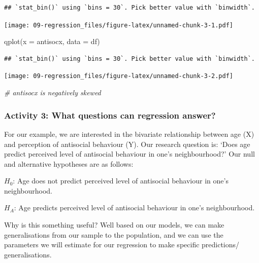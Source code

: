\documentclass[
]{book}
\newenvironment{Shaded}{\begin{snugshade}}{\end{snugshade}}
\newcommand{\AttributeTok}[1]{\textcolor[rgb]{0.77,0.63,0.00}{#1}}
\newcommand{\CommentTok}[1]{\textcolor[rgb]{0.56,0.35,0.01}{\textit{#1}}}
\newcommand{\FunctionTok}[1]{\textcolor[rgb]{0.00,0.00,0.00}{#1}}
\newcommand{\NormalTok}[1]{#1}
\begin{document}
\begin{verbatim}
## `stat_bin()` using `bins = 30`. Pick better value with `binwidth`.
\end{verbatim}

\texttt{[image: 09-regression\_files/figure-latex/unnamed-chunk-3-1.pdf]}

\begin{Shaded}
\begin{Highlighting}[]
\FunctionTok{qplot}\NormalTok{(}\AttributeTok{x =}\NormalTok{ antisocx, }\AttributeTok{data =}\NormalTok{ df)}
\end{Highlighting}
\end{Shaded}

\begin{verbatim}
## `stat_bin()` using `bins = 30`. Pick better value with `binwidth`.
\end{verbatim}

\texttt{[image: 09-regression\_files/figure-latex/unnamed-chunk-3-2.pdf]}

\begin{Shaded}
\begin{Highlighting}[]
\CommentTok{\# antisocx is negatively skewed}
\end{Highlighting}
\end{Shaded}

\hypertarget{activity-3-what-questions-can-regression-answer}{%
\subsubsection{Activity 3: What questions can regression answer?}\label{activity-3-what-questions-can-regression-answer}}

For our example, we are interested in the bivariate relationship between age (X) and perception of antisocial behaviour (Y). Our research question is: `Does age predict perceived level of antisocial behaviour in one's neighbourhood?' Our null and alternative hypotheses are as follows:

\(H_0\): Age does not predict perceived level of antisocial behaviour in one's neighbourhood.

\(H_A\): Age predicts perceived level of antisocial behaviour in one's neighbourhood.

Why is this something useful? Well based on our models, we can make generalisations from our sample to the population, and we can use the parameters we will estimate for our regression to make specific predictions/ generalisations.
\end{document}
